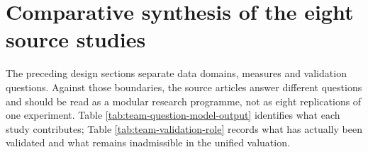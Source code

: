 \section{Comparative synthesis of the eight source studies}
\label{sec:team-study-synthesis}

The preceding design sections separate data domains, measures and validation
questions. Against those boundaries, the source articles answer different
questions and should be read as a modular research programme, not as eight
replications of one experiment. Table
\ref{tab:team-question-model-output} identifies what each study contributes;
Table \ref{tab:team-validation-role} records what has actually been validated
and what remains inadmissible in the unified valuation.

